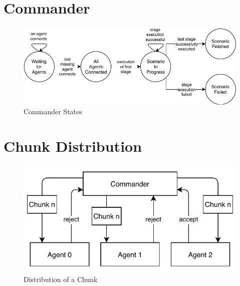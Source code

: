 \section{Commander}
\begin{figure}[h]
	\begin{center}
	\includegraphics[scale=1]{Resources/PDF/CommanderStates}
	\caption{Commander States}
	\label{pic:CommanderStates}
	\end{center}
\end{figure}

\section{Chunk Distribution}
\begin{figure}[h]
	\begin{center}
	\includegraphics[scale=1]{Resources/PDF/ChunkDistribution}
	\caption{Distribution of a Chunk}
	\label{pic:ChunkDistribution}
	\end{center}
\end{figure}

